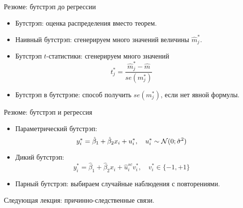 \begin{frame}{Резюме: бутстрэп до регрессии}


\begin{itemize}[<+->]
\item Бутстрэп: оценка распределения вместо теорем.
\item Наивный бутстрэп: сгенерируем много значений величины $\hat m^*_j$. 
\item Бутстрэп $t$-статистики: сгенерируем много значений 
\[
t^*_j = \frac{\hat m^*_j - \hat m}{se(m^*_j)}
\]
\item Бутстрэп в бутстрэпе: способ получить $se(m^*_j)$, если нет явной формулы.
\end{itemize}


\end{frame}
    
\begin{frame}{Резюме: бутстрэп и регрессия}


\begin{itemize}[<+->]
\item Параметрический бутстрэп: 
\[
    y_i^* = \hat \beta_1 + \hat\beta_2 x_i + u_i^*, \quad u_i^* \sim \mathcal{N}(0;\hat\sigma^2)
\]
\item Дикий бутстрэп: 
\[
    y_i^* = \hat \beta_1 + \hat\beta_2 x_i + \hat u_i^{sc} v_i^*, \quad v_i^* \in \{-1, +1\}
\]
\item Парный бутстрэп: выбираем случайные наблюдения с повторениями.
\end{itemize}

\pause

\alert{Следующая лекция:} причинно-следственные связи.

\end{frame}
    